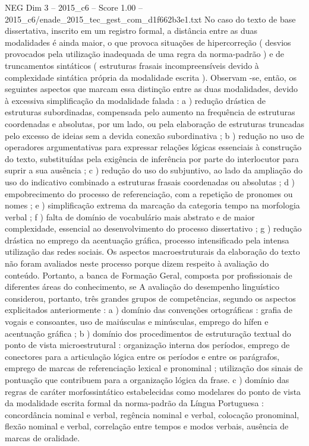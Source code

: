 \begin{textsample}{NEG Dim 3 – 2015\_c6 – Score 1.00 – 2015\_c6/enade\_2015\_tec\_gest\_com\_d1f662b3e1.txt}
No caso do texto de base dissertativa, inscrito em um registro formal, a distância entre as duas modalidades é ainda maior, o que provoca situações de hipercorreção ( desvios provocados pela utilização inadequada de uma regra da norma-padrão ) e de truncamentos sintáticos ( estruturas frasais incompreensíveis devido à complexidade sintática própria da modalidade escrita ).
Observam -se, então, os seguintes aspectos que marcam essa distinção entre as duas modalidades, devido à excessiva simplificação da modalidade falada : a ) redução drástica de estruturas subordinadas, compensada pelo aumento na frequência de estruturas coordenadas e absolutas, por um lado, ou pela elaboração de estruturas truncadas pelo excesso de ideias sem a devida conexão subordinativa ; b ) redução no uso de operadores argumentativas para expressar relações lógicas essenciais à construção do texto, substituídas pela exigência de inferência por parte do interlocutor para suprir a sua ausência ; c ) redução do uso do subjuntivo, ao lado da ampliação do uso do indicativo combinado a estruturas frasais coordenadas ou absolutas ; d ) empobrecimento do processo de referenciação, com a repetição de pronomes ou nomes ; e ) simplificação extrema da marcação da categoria tempo na morfologia verbal ; f ) falta de domínio de vocabulário mais abstrato e de maior complexidade, essencial ao desenvolvimento do processo dissertativo ; g ) redução drástica no emprego da acentuação gráfica, processo intensificado pela intensa utilização das redes sociais.
Os aspectos macroestruturais da elaboração do texto não foram avaliados neste processo porque dizem respeito à avaliação do conteúdo.
Portanto, a banca de Formação Geral, composta por profissionais de diferentes áreas do conhecimento, se A avaliação do desempenho linguístico considerou, portanto, três grandes grupos de competências, segundo os aspectos explicitados anteriormente : a ) domínio das convenções ortográficas : grafia de vogais e consoantes, uso de maiúsculas e minúsculas, emprego do hífen e acentuação gráfica ; b ) domínio dos procedimentos de estruturação textual do ponto de vista microestrutural : organização interna dos períodos, emprego de conectores para a articulação lógica entre os períodos e entre os parágrafos, emprego de marcas de referenciação lexical e pronominal ; utilização dos sinais de pontuação que contribuem para a organização lógica da frase. c ) domínio das regras de caráter morfossintático estabelecidas como modelares do ponto de vista da modalidade escrita formal da norma-padrão da Língua Portuguesa : concordância nominal e verbal, regência nominal e verbal, colocação pronominal, flexão nominal e verbal, correlação entre tempos e modos verbais, ausência de marcas de oralidade.

\end{textsample}
